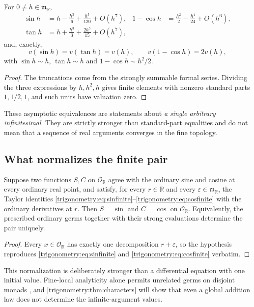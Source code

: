 \documentclass[11pt,letterpaper]{article}
\numberwithin{equation}{section}
\theoremstyle{definition}
\theoremstyle{remark}
\newcommand{\R}{\mathbb R}
\newcommand{\OO}{\mathcal O}
\newcommand{\mm}{\mathfrak m}
\newcommand{\eps}{\varepsilon}
\begin{document}
\begin{proposition}\label{trigonometry:prop:leading}
For $0\ne h\in\mm_{\R}$,
\begin{align}
 \sin h&=h-\frac{h^3}6+\frac{h^5}{120}+O(h^7),&
 1-\cos h&=\frac{h^2}2-\frac{h^4}{24}+O(h^6),\\
 \tan h&=h+\frac{h^3}3+\frac{2h^5}{15}+O(h^7),
\end{align}
and, exactly,
\begin{equation}\label{trigonometry:eq:sinval}
 v(\sin h)=v(\tan h)=v(h),\qquad v(1-\cos h)=2v(h),
\end{equation}
with $\sin h\sim h$, $\tan h\sim h$ and $1-\cos h\sim h^2/2$.
\end{proposition}
\begin{proof}
The truncations come from the strongly summable formal series. Dividing the three expressions by
$h,h^2,h$ gives finite elements with nonzero standard parts $1,1/2,1$, and such units have
valuation zero.
\end{proof}
These asymptotic equivalences are statements about \emph{a single arbitrary infinitesimal}. They
are strictly stronger than standard-part equalities and do not mean that a sequence of real
arguments converges in the fine topology.

\subsection{What normalizes the finite pair}
\begin{proposition}
\label{trigonometry:prop:normalization}
Suppose two functions $S,C$ on $\OO_{\R}$ agree with the ordinary sine and cosine at every
ordinary real point, and satisfy, for every $r\in\R$ and every $\eps\in\mm_{\R}$, the Taylor
identities \cref{trigonometry:eq:sinfinite}--\cref{trigonometry:eq:cosfinite} with the ordinary
derivatives at $r$. Then $S=\sin$ and $C=\cos$ on $\OO_{\R}$. Equivalently, the prescribed ordinary
germs together with their strong evaluations determine the pair uniquely.
\end{proposition}
\begin{proof}
Every $x\in\OO_{\R}$ has exactly one decomposition $r+\eps$, so the hypothesis
reproduces \cref{trigonometry:eq:sinfinite} and \cref{trigonometry:eq:cosfinite}
verbatim.
\end{proof}
This normalization is deliberately stronger than a differential equation with one initial value.
Fine-local analyticity alone permits unrelated germs on disjoint monads \cite{SourceAnalysis}, and
\cref{trigonometry:thm:characters} will show that even a global addition law does not determine
the infinite-argument values.
\end{document}
